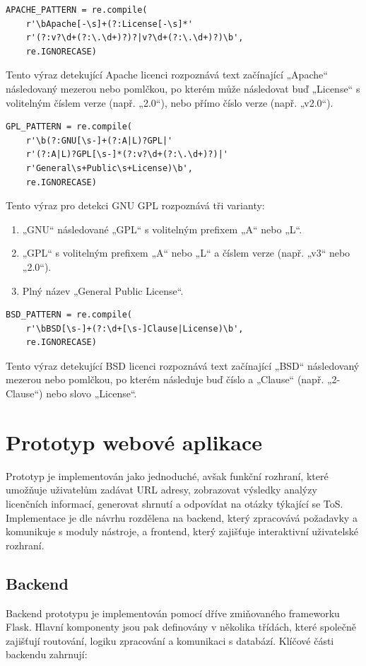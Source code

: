 \begin{lstlisting}[caption={Regulární výraz pro Apache License},label={lst:apache-pattern}]
APACHE_PATTERN = re.compile(
    r'\bApache[-\s]+(?:License[-\s]*'
    r'(?:v?\d+(?:\.\d+)?)?|v?\d+(?:\.\d+)?)\b',
    re.IGNORECASE)
\end{lstlisting}
Tento výraz detekující Apache licenci rozpoznává text začínající „Apache“ následovaný mezerou nebo pomlčkou, po kterém může následovat buď „License“ s volitelným číslem verze (např. „2.0“), nebo přímo číslo verze (např. „v2.0“).

\begin{lstlisting}[caption={Regulární výraz pro GNU GPL},label={lst:gpl-pattern}]
GPL_PATTERN = re.compile(
    r'\b(?:GNU[\s-]+(?:A|L)?GPL|'
    r'(?:A|L)?GPL[\s-]*(?:v?\d+(?:\.\d+)?)|'
    r'General\s+Public\s+License)\b',
    re.IGNORECASE)
\end{lstlisting}
Tento výraz pro detekci GNU GPL rozpoznává tři varianty:
\begin{enumerate}
    \item „GNU“ následované „GPL“ s volitelným prefixem „A“ nebo „L“.
    \item „GPL“ s volitelným prefixem „A“ nebo „L“ a číslem verze (např. „v3“ nebo „2.0“).
    \item Plný název „General Public License“.
\end{enumerate}

\clearpage
\begin{lstlisting}[caption={Regulární výraz pro BSD License},label={lst:bsd-pattern}]
BSD_PATTERN = re.compile(
    r'\bBSD[\s-]+(?:\d+[\s-]Clause|License)\b',
    re.IGNORECASE)
\end{lstlisting}
Tento výraz detekující BSD licenci rozpoznává text začínající „BSD“ následovaný mezerou nebo pomlčkou, po kterém následuje buď číslo a „Clause“ (např. „2-Clause“) nebo slovo „License“.

\section{Prototyp webové aplikace}
Prototyp je implementován jako jednoduché, avšak funkční rozhraní, které umožňuje uživatelům zadávat URL adresy, zobrazovat výsledky analýzy licenčních informací, generovat shrnutí a odpovídat na otázky týkající se ToS.
Implementace je dle návrhu rozdělena na backend, který zpracovává požadavky a komunikuje s moduly nástroje, a frontend, který zajišťuje interaktivní uživatelské rozhraní.
\subsection{Backend}
Backend prototypu je implementován pomocí dříve zmiňovaného frameworku Flask.
Hlavní komponenty jsou pak definovány v několika třídách, které společně zajišťují routování, logiku zpracování a komunikaci s databází.
Klíčové části backendu zahrnují:

